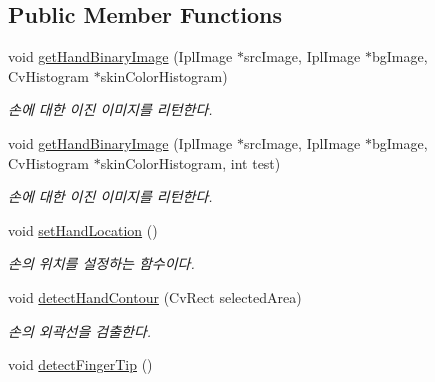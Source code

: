 \subsection*{Public Member Functions}
\begin{DoxyCompactItemize}
\item 
\hypertarget{class_fk_finger_tip_detector_a63d0815e796cd43acbf920de0e26d650}{}void \hyperlink{class_fk_finger_tip_detector_a63d0815e796cd43acbf920de0e26d650}{get\+Hand\+Binary\+Image} (Ipl\+Image $\ast$src\+Image, Ipl\+Image $\ast$bg\+Image, Cv\+Histogram $\ast$skin\+Color\+Histogram)\label{class_fk_finger_tip_detector_a63d0815e796cd43acbf920de0e26d650}

\begin{DoxyCompactList}\small\item\em 손에 대한 이진 이미지를 리턴한다. \end{DoxyCompactList}\item 
\hypertarget{class_fk_finger_tip_detector_a88ccd7cb697e05d445a25b3e1d8f3b0f}{}void \hyperlink{class_fk_finger_tip_detector_a88ccd7cb697e05d445a25b3e1d8f3b0f}{get\+Hand\+Binary\+Image} (Ipl\+Image $\ast$src\+Image, Ipl\+Image $\ast$bg\+Image, Cv\+Histogram $\ast$skin\+Color\+Histogram, int test)\label{class_fk_finger_tip_detector_a88ccd7cb697e05d445a25b3e1d8f3b0f}

\begin{DoxyCompactList}\small\item\em 손에 대한 이진 이미지를 리턴한다. \end{DoxyCompactList}\item 
\hypertarget{class_fk_finger_tip_detector_a7add97f44f934a59950bfde3d9bf91e3}{}void \hyperlink{class_fk_finger_tip_detector_a7add97f44f934a59950bfde3d9bf91e3}{set\+Hand\+Location} ()\label{class_fk_finger_tip_detector_a7add97f44f934a59950bfde3d9bf91e3}

\begin{DoxyCompactList}\small\item\em 손의 위치를 설정하는 함수이다. \end{DoxyCompactList}\item 
\hypertarget{class_fk_finger_tip_detector_a7d33dd63be8a37c0bd3bf2edfb596f90}{}void \hyperlink{class_fk_finger_tip_detector_a7d33dd63be8a37c0bd3bf2edfb596f90}{detect\+Hand\+Contour} (Cv\+Rect selected\+Area)\label{class_fk_finger_tip_detector_a7d33dd63be8a37c0bd3bf2edfb596f90}

\begin{DoxyCompactList}\small\item\em 손의 외곽선을 검출한다. \end{DoxyCompactList}\item 
\hypertarget{class_fk_finger_tip_detector_afa5aafb050cf0f35e2c2543a59f02670}{}void \hyperlink{class_fk_finger_tip_detector_afa5aafb050cf0f35e2c2543a59f02670}{detect\+Finger\+Tip} ()\label{class_fk_finger_tip_detector_afa5aafb050cf0f35e2c2543a59f02670}


\end{DoxyCompactItemize}
